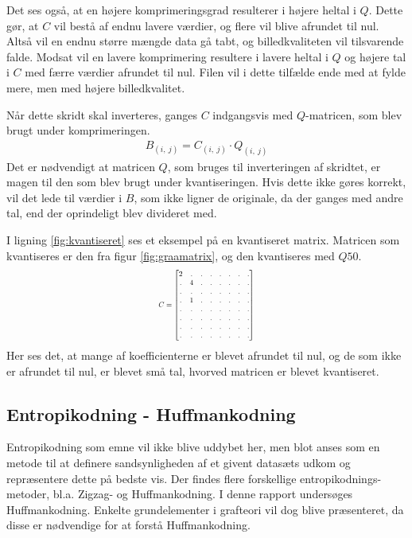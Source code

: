 Det ses også, at en højere komprimeringsgrad resulterer i højere heltal i $Q$. Dette gør, at $C$ vil bestå af endnu lavere værdier, og flere vil blive afrundet til nul. Altså vil en endnu større mængde data gå tabt, og billedkvaliteten vil tilsvarende falde. Modsat vil en lavere komprimering resultere i lavere heltal i $Q$ og højere tal i $C$ med færre værdier afrundet til nul. Filen vil i dette tilfælde ende med at fylde mere, men med højere billedkvalitet.

Når dette skridt skal inverteres, ganges $C$ indgangsvis med $Q$-matricen, som blev brugt under komprimeringen.
\begin{align}
B_{(i,\ j)}=C_{(i,\ j)} \cdot Q_{(i,\ j)}
\end{align}
Det er nødvendigt at matricen $Q$, som bruges til inverteringen af skridtet, er magen til den som blev brugt under kvantiseringen. Hvis dette ikke gøres korrekt, vil det lede til værdier i $B$, som ikke ligner de originale, da der ganges med andre tal, end der oprindeligt blev divideret med.

I ligning \ref{fig:kvantiseret} ses et eksempel på en kvantiseret matrix. Matricen som kvantiseres er den fra figur \vref{fig:graamatrix}, og den kvantiseres med $Q50$.
\begin{equation}\resizebox{0.25\textwidth}{!}{$
	C=
\begin{bmatrix}
	2	&	.	& .		& .		& 	.	&	.	& .		& .	\\
	.	&	4	& .		& .		& 	.	& 	.	& .		& .	\\
	.	&	.	& .		& .		& 	.	& 	.	& .		& .	\\
	.	&	1	& .		& .		& 	.	& 	.	& .		& .	\\
	.	&	.	& .		& .		& 	.	& 	.	& .		& .	\\
	.	&	.	& .		& .		& 	.	& 	.	& .		& .	\\
	.	&	.	& .		& .		& 	.	& 	.	& .		& .	\\
	.	&	.	& .		& .		& 	.	& 	.	& .		& .	\\
\end{bmatrix}$}
\label{fig:kvantiseret}
\end{equation}
Her ses det, at mange af koefficienterne er blevet afrundet til nul, og de som ikke er afrundet til nul, er blevet små tal, hvorved matricen er blevet kvantiseret.
\subsection{Entropikodning - Huffmankodning}
\label{sec:Huffman}
Entropikodning som emne vil ikke blive uddybet her, men blot anses som en metode til at definere sandsynligheden af et givent datasæts udkom og repræsentere dette på bedste vis. Der findes flere forskellige entropikodnings-metoder, bl.a. Zigzag- og Huffmankodning. I denne rapport undersøges Huffmankodning. Enkelte grundelementer i grafteori vil dog blive præsenteret, da disse er nødvendige for at forstå Huffmankodning.

